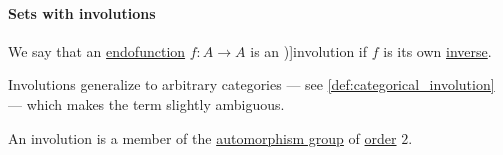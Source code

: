 \paragraph{Sets with involutions}

\begin{definition}\label{def:set_involution}
  We say that an \hyperref[def:endofunction]{endofunction} \( f: A \to A \) is an \term[ru=инволюция (множеств) (\cite[65]{Гуров2013ТеорияРешёток})]{involution} if \( f \) is its own \hyperref[def:function_invertibility/bijective]{inverse}.
\end{definition}
\begin{comments}
  \item Involutions generalize to arbitrary categories --- see \cref{def:categorical_involution} --- which makes the term slightly ambiguous.

  \item An involution is a member of the \hyperref[def:automorphism_group]{automorphism group} of \hyperref[def:group_element_order]{order} \( 2 \).
\end{comments}

